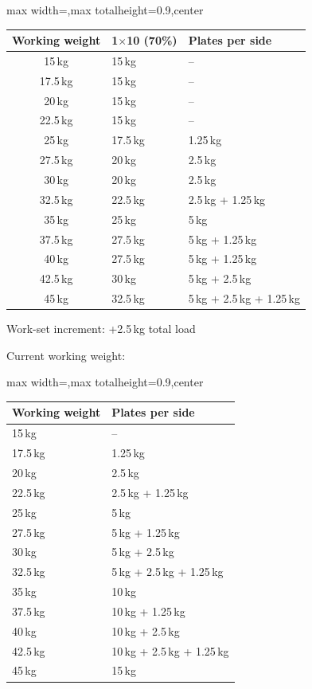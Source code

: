 \documentclass[11pt,a4paper]{article}
\newcommand{\tablearraystretch}{1.15}
\begin{document}
\begin{center}
\renewcommand{\arraystretch}{\tablearraystretch}
\begin{adjustbox}{max width=\linewidth,max totalheight=0.9\textheight,center}
\begin{tabular}{cll}
\toprule
Working weight & 1$\times$10 (70\%) & Plates per side \\
\midrule
15\,kg   & 15\,kg   & -- \\
17.5\,kg & 15\,kg   & -- \\
20\,kg   & 15\,kg   & -- \\
22.5\,kg & 15\,kg   & -- \\
25\,kg   & 17.5\,kg & 1.25\,kg \\
27.5\,kg & 20\,kg   & 2.5\,kg \\
30\,kg   & 20\,kg   & 2.5\,kg \\
32.5\,kg & 22.5\,kg & 2.5\,kg + 1.25\,kg \\
35\,kg   & 25\,kg   & 5\,kg \\
37.5\,kg & 27.5\,kg & 5\,kg + 1.25\,kg \\
40\,kg   & 27.5\,kg & 5\,kg + 1.25\,kg \\
42.5\,kg & 30\,kg   & 5\,kg + 2.5\,kg \\
45\,kg   & 32.5\,kg & 5\,kg + 2.5\,kg + 1.25\,kg \\
\bottomrule
\end{tabular}
\end{adjustbox}
\renewcommand{\arraystretch}{1}
\end{center}

Work-set increment: +2.5\,kg total load

Current working weight:

\begin{center}
\renewcommand{\arraystretch}{\tablearraystretch}
\begin{adjustbox}{max width=\linewidth,max totalheight=0.9\textheight,center}
\begin{tabular}{ll}
\toprule
Working weight & Plates per side \\
\midrule
15\,kg & -- \\
17.5\,kg & 1.25\,kg \\
20\,kg & 2.5\,kg \\
22.5\,kg & 2.5\,kg + 1.25\,kg \\
25\,kg & 5\,kg \\
27.5\,kg & 5\,kg + 1.25\,kg \\
30\,kg & 5\,kg + 2.5\,kg \\
32.5\,kg & 5\,kg + 2.5\,kg + 1.25\,kg \\
35\,kg & 10\,kg \\
37.5\,kg & 10\,kg + 1.25\,kg \\
40\,kg & 10\,kg + 2.5\,kg \\
42.5\,kg & 10\,kg + 2.5\,kg + 1.25\,kg \\
45\,kg & 15\,kg \\
\bottomrule
\end{tabular}
\end{adjustbox}
\renewcommand{\arraystretch}{1}
\end{center}
\end{document}
